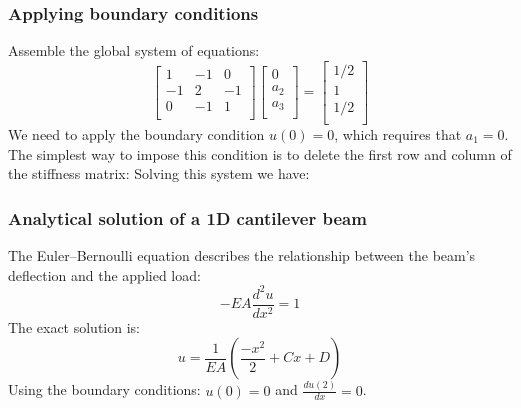 \documentclass[notes]{beamer}
\begin{document}
\begin{frame}
\frametitle{Applying boundary conditions}
Assemble the global system of equations:
\begin{equation*}
\begin{bmatrix}
1 & -1 &  0  \\
-1 &  2 & -1 \\
0 & -1 &  1 \\ 
\end{bmatrix}
\begin{bmatrix}
0 \\
a_2 \\
a_3 \\
\end{bmatrix} = %
\begin{bmatrix}
1/2 \\
1 \\
1/2 \\
\end{bmatrix}
\end{equation*}
We need to apply the boundary condition $u(0) = 0$, which requires that $a_1 = 0$. The
simplest way to impose this condition is to delete the first row and column of the
stiffness matrix:
Solving this system we have: 
\end{frame}

\begin{frame}
\frametitle{Analytical solution of a 1D cantilever beam}
The Euler–Bernoulli equation describes the relationship between the beam's deflection and the applied load:
\begin{equation*}
	-EA\frac{d^2u}{dx^2} = 1
\end{equation*}
The exact solution is:
\begin{equation*}
	u = \frac{1}{EA}(\frac{-x^2}{2} + Cx + D)
\end{equation*}
Using the boundary conditions: $u(0) = 0$ and $\frac{du(2)}{dx} = 0$. 
\end{frame}
\end{document}
